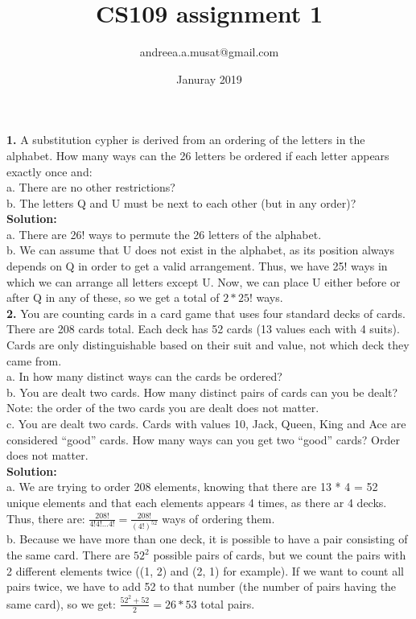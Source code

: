 \documentclass[10pt,a4paper,oneside,draft]{report}
\title{CS109 assignment 1}
\author{andreea.a.musat@gmail.com}
\date{Januray 2019}
\begin{document}
\maketitle

\textbf{1.} A substitution cypher is derived from an ordering of the letters in the alphabet. How many ways can the 26 letters be ordered if each letter appears exactly once and:\\
a. There are no other restrictions? \\
b. The letters Q and U must be next to each other (but in any order)? \\

\textbf{Solution:} \\

a. There are 26! ways to permute the 26 letters of the alphabet. \\

b. We can assume that U does not exist in the alphabet, as its position always depends on Q in order to get a valid arrangement. Thus, we have 25! ways in which we can arrange all letters except U. Now, we can place U either before or after Q in any of these, so we get a total of $2 * 25!$ ways.\\

\textbf{2.} You are counting cards in a card game that uses four standard decks of cards. There are 208 cards total. Each deck has 52 cards (13 values each with 4 suits). Cards are only distinguishable based on their suit and value, not which deck they came from. \\
a. In how many distinct ways can the cards be ordered? \\
b. You are dealt two cards. How many distinct pairs of cards can you be dealt? Note: the order of the two cards you are dealt does not matter. \\
c. You are dealt two cards. Cards with values 10, Jack, Queen, King and Ace are considered “good” cards. How many ways can you get two “good” cards? Order does not matter. \\

\textbf{Solution:} \\

a. We are trying to order 208 elements, knowing that there are 13 * 4 = 52 unique elements and that each elements appears 4 times, as there ar 4 decks. Thus, there are: $\frac{208!}{4! 4! ... 4!} = \frac{208!}{(4!)^{52}}$ ways of ordering them. \\

b. Because we have more than one deck, it is possible to have a pair consisting of the same card. There are $52^2$ possible pairs of cards, but we count the pairs with 2 different elements twice ((1, 2) and (2, 1) for example). If we want to count all pairs twice, we have to add 52 to that number (the number of pairs having the same card), so we get: $\frac{52^2 + 52}{2} = 26 * 53$ total pairs. \\
\end{document}
